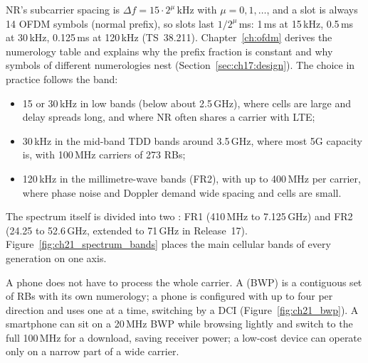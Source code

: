 NR's subcarrier spacing is $\Delta f=15\cdot2^{\mu}$\,kHz with $\mu=0,1,\ldots$, and a slot is
always 14 OFDM symbols (normal prefix), so slots last $1/2^{\mu}$\,ms: 1\,ms at 15\,kHz, 0.5\,ms at
30\,kHz, 0.125\,ms at 120\,kHz (TS~38.211). Chapter~\ref{ch:ofdm} derives the numerology table and
explains why the prefix fraction is constant and why symbols of different numerologies nest
(Section~\ref{sec:ch17:design}). The choice in practice follows the band:
\begin{itemize}
\item 15 or 30\,kHz in low bands (below about 2.5\,GHz), where cells are large and delay spreads
long, and where NR often shares a carrier with LTE;
\item 30\,kHz in the mid-band TDD bands around 3.5\,GHz, where most 5G capacity is, with 100\,MHz
carriers of 273 RBs;
\item 120\,kHz in the millimetre-wave bands (FR2), with up to 400\,MHz per carrier, where phase noise
and Doppler demand wide spacing and cells are small.
\end{itemize}


The spectrum itself is divided into two : FR1 (410\,MHz to 7.125\,GHz) and FR2
(24.25 to 52.6\,GHz, extended to 71\,GHz in Release~17). Figure~\ref{fig:ch21_spectrum_bands} places
the main cellular bands of every generation on one axis.


A phone does not have to process the whole carrier. A  (BWP) is a contiguous
set of RBs with its own numerology; a phone is configured with up to four per direction and uses one
at a time, switching by a DCI (Figure~\ref{fig:ch21_bwp}). A smartphone can sit on a 20\,MHz BWP
while browsing lightly and switch to the full 100\,MHz for a download, saving receiver power; a
low-cost device can operate only on a narrow part of a wide carrier.

